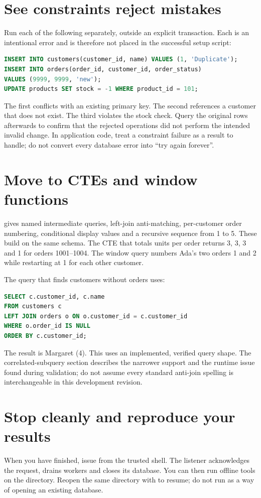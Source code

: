 \section{See constraints reject mistakes}
Run each of the following separately, outside an explicit transaction. Each
is an intentional error and is therefore not placed in the successful setup
script:
\begin{lstlisting}[language=SQL]
INSERT INTO customers(customer_id, name) VALUES (1, 'Duplicate');
INSERT INTO orders(order_id, customer_id, order_status)
VALUES (9999, 9999, 'new');
UPDATE products SET stock = -1 WHERE product_id = 101;
\end{lstlisting}
The first conflicts with an existing primary key. The second references a
customer that does not exist. The third violates the stock check. Query the
original rows afterwards to confirm that the rejected operations did not
perform the intended invalid change. In application code, treat a constraint
failure as a result to handle; do not convert every database error into
``try again forever''.

\section{Move to CTEs and window functions}
 gives named intermediate queries,
left-join anti-matching, per-customer order numbering, conditional display
values and a recursive sequence from 1 to 5. These build on the same schema.
The CTE that totals units per order returns 3, 3, 3 and 1 for orders
1001--1004. The window query numbers Ada's two orders 1 and 2 while restarting
at 1 for each other customer.

The query that finds customers without orders uses:
\begin{lstlisting}[language=SQL]
SELECT c.customer_id, c.name
FROM customers c
LEFT JOIN orders o ON o.customer_id = c.customer_id
WHERE o.order_id IS NULL
ORDER BY c.customer_id;
\end{lstlisting}
The result is Margaret (4). This uses an implemented, verified query shape.
The correlated-subquery section describes the narrower support and the
runtime issue found during validation; do not assume every standard
anti-join spelling is interchangeable in this development revision.

\section{Stop cleanly and reproduce your results}
When you have finished, issue  from the trusted shell. The
listener acknowledges the request, drains workers and closes its database.
You can then run offline tools on the directory. Reopen the same directory
with  to resume; do not run  as a way of opening
an existing database.

